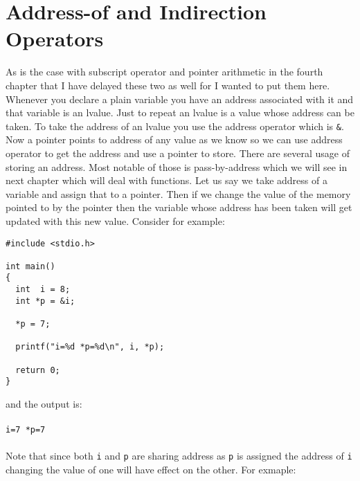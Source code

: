 \section{Address-of and Indirection Operators}
As is the case with subscript operator and pointer arithmetic in the fourth
chapter that I have delayed these two as well for I wanted to put them
here. Whenever you declare a plain variable you have an address associated with
it and that variable is an lvalue. Just to repeat an lvalue is a value whose
address can be taken. To take the address of an lvalue you use the address
operator which is \texttt{\&}. Now a pointer points to address of any value as
we know so we can use address operator to get the address and use a pointer to
store. There are several usage of storing an address. Most notable of those is
pass-by-address which we will see in next chapter which will deal with
functions. Let us say we take address of a variable and assign that to a
pointer. Then if we change the value of the memory pointed to by the pointer
then the variable whose address has been taken will get updated with this new
value. Consider for example:

\begin{verbatim}
#include <stdio.h>

int main()
{
  int  i = 8;
  int *p = &i;

  *p = 7;

  printf("i=%d *p=%d\n", i, *p);

  return 0;
}
\end{verbatim}
and the output is:
\\\\\texttt{i=7 *p=7\\\\}
Note that since both \texttt{i} and \texttt{p} are sharing address as
\texttt{p} is assigned the address of \texttt{i} changing the value of one will
have effect on the other. For exmaple:

